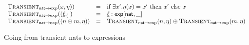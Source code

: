 \begin{figure}
  \begin{displaymath}
    \begin{array}{lcl}
      \textsc{Transient}_{\mathsf{nat} \to \exp}(x, \eta)) &=& \text{if } \exists x'. \eta(x) = x' \text{ then } x' \text{ else } x \\
      \textsc{Transient}_{\mathsf{nat} \to \exp}((\underline{\ell}, _)) &=& \underline{\ell} : \mathsf{exp}[\mathsf{nat}, \_] \\
      \textsc{Transient}_{\mathsf{nat} \to \exp}((n \oplus m, \eta)) &=& \textsc{Transient}_{\mathsf{nat} \to \exp}(n, \eta) \oplus \textsc{Transient}_{\mathsf{nat} \to \exp}(m, \eta) \\
    \end{array}
  \end{displaymath}
  \caption{Going from transient nats to expressions}
\end{figure}
